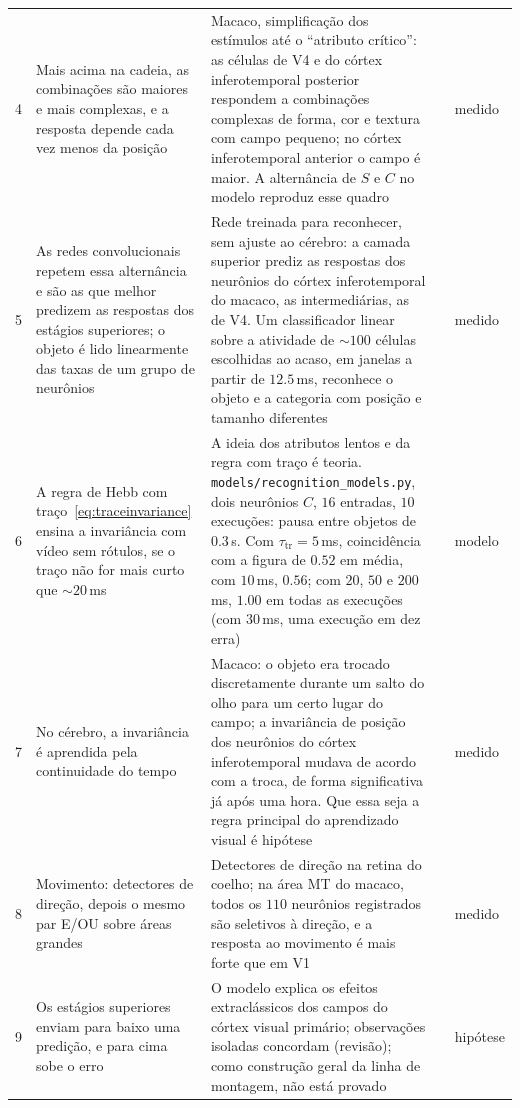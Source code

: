 {\begin{longtable}{>{\raggedright}p{0.5cm}>{\raggedright}p{4.0cm}>{\raggedright}p{5.6cm}>{\raggedright}p{2.3cm}>{\raggedright\arraybackslash}p{1.7cm}}
4 & Mais acima na cadeia, as combinações são maiores e mais complexas, e a resposta depende cada vez menos da posição & Macaco, simplificação dos estímulos até o ``atributo crítico'': as células de V4 e do córtex inferotemporal posterior respondem a combinações complexas de forma, cor e textura com campo pequeno; no córtex inferotemporal anterior o campo é maior. A alternância de $S$ e $C$ no modelo reproduz esse quadro & \cite{KobatakeTanaka1994,Riesenhuber1999} & medido \\
5 & As redes convolucionais repetem essa alternância e são as que melhor predizem as respostas dos estágios superiores; o objeto é lido linearmente das taxas de um grupo de neurônios & Rede treinada para reconhecer, sem ajuste ao cérebro: a camada superior prediz as respostas dos neurônios do córtex inferotemporal do macaco, as intermediárias, as de V4. Um classificador linear sobre a atividade de $\sim100$ células escolhidas ao acaso, em janelas a partir de $12.5$\,ms, reconhece o objeto e a categoria com posição e tamanho diferentes & \cite{Fukushima1980,Yamins2014,Hung2005} & medido \\
6 & A regra de Hebb com traço~\eqref{eq:traceinvariance} ensina a invariância com vídeo sem rótulos, se o traço não for mais curto que $\sim20$\,ms & A ideia dos atributos lentos e da regra com traço é teoria. \texttt{models/\allowbreak recognition\_models.py}, dois neurônios $C$, $16$ entradas, $10$ execuções: pausa entre objetos de $0.3$\,s. Com $\tau_{\text{tr}}=5$\,ms, coincidência com a figura de $0.52$ em média, com $10$\,ms, $0.56$; com $20$, $50$ e $200$\,ms, $1.00$ em todas as execuções (com $30$\,ms, uma execução em dez erra) & \cite{Foldiak1991,WiskottSejnowski2002} & modelo \\
7 & No cérebro, a invariância é aprendida pela continuidade do tempo & Macaco: o objeto era trocado discretamente durante um salto do olho para um certo lugar do campo; a invariância de posição dos neurônios do córtex inferotemporal mudava de acordo com a troca, de forma significativa já após uma hora. Que essa seja a regra principal do aprendizado visual é hipótese & \cite{LiDiCarlo2008} & medido \\
8 & Movimento: detectores de direção, depois o mesmo par E/OU sobre áreas grandes & Detectores de direção na retina do coelho; na área MT do macaco, todos os $110$ neurônios registrados são seletivos à direção, e a resposta ao movimento é mais forte que em V1 & \cite{Barlow1965,Albright1984} & medido \\
9 & Os estágios superiores enviam para baixo uma predição, e para cima sobe o erro & O modelo explica os efeitos extraclássicos dos campos do córtex visual primário; observações isoladas concordam (revisão); como construção geral da linha de montagem, não está provado & \cite{RaoBallard1999,Keller2018} & hipótese \\

\end{longtable}}
